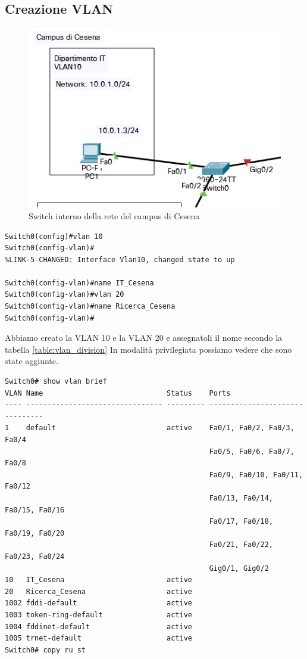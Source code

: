\documentclass[a4paper,12pt]{report}
\begin{document}
\subsection{Creazione VLAN}
\begin{figure}[H]
\includegraphics[]{configurazione_switch.png}
\caption{Switch interno della rete del campus di Cesena}
\label{fig:switch_cesena}
\end{figure}
\begin{verbatim}
Switch0(config)#vlan 10
Switch0(config-vlan)#
%LINK-5-CHANGED: Interface Vlan10, changed state to up

Switch0(config-vlan)#name IT_Cesena
Switch0(config-vlan)#vlan 20
Switch0(config-vlan)#name Ricerca_Cesena
Switch0(config-vlan)#
\end{verbatim}
Abbiamo creato la VLAN 10 e la VLAN 20 e assegnatoli il nome secondo la tabella \ref{table:vlan_division}
In modalità privilegiata possiamo vedere che sono state aggiunte.
\begin{verbatim}
Switch0# show vlan brief
VLAN Name                             Status    Ports
---- -------------------------------- --------- -------------------------------
1    default                          active    Fa0/1, Fa0/2, Fa0/3, Fa0/4
                                                Fa0/5, Fa0/6, Fa0/7, Fa0/8
                                                Fa0/9, Fa0/10, Fa0/11, Fa0/12
                                                Fa0/13, Fa0/14, Fa0/15, Fa0/16
                                                Fa0/17, Fa0/18, Fa0/19, Fa0/20
                                                Fa0/21, Fa0/22, Fa0/23, Fa0/24
                                                Gig0/1, Gig0/2
10   IT_Cesena                        active    
20   Ricerca_Cesena                   active    
1002 fddi-default                     active    
1003 token-ring-default               active    
1004 fddinet-default                  active    
1005 trnet-default                    active    
Switch0# copy ru st
\end{verbatim}
\end{document}
